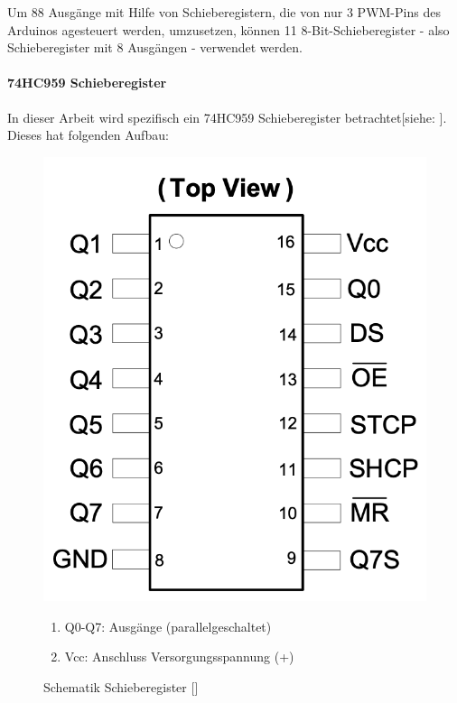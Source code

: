 Um 88 Ausgänge mit Hilfe von Schieberegistern, die von nur 3 \ac{PWM}-Pins des Arduinos agesteuert werden, umzusetzen,
können 11 8-Bit-Schieberegister  - also Schieberegister mit 8 Ausgängen - verwendet werden.

\paragraph{74HC959 Schieberegister}
In dieser Arbeit wird spezifisch ein 74HC959 Schieberegister betrachtet[siehe: \cite*[siehe ][]{DatasheetSchieberegister74HC595}].
Dieses hat folgenden Aufbau:
\begin{figure}[htbp]
\begin{minipage}{0.45\textwidth}
		\includegraphics [width=1\textwidth] {img/Schieberegister}
		\caption{Schematik Schieberegister [\cite*[siehe ][]{DatasheetSchieberegister74HC595}]}
		\label{img:Shift}
\end{minipage}
\begin{minipage}{0.55\textwidth}
	\begin{enumerate}
		\item Q0-Q7: Ausgänge (parallelgeschaltet)
		\item Vcc: Anschluss Versorgungsspannung (+)

\end{enumerate}
\end{minipage}
\end{figure}
